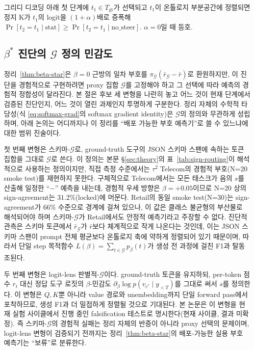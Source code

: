 \begin{corollary}[정지 K의 반복 편향]\label{cor:seka-repeat}
그리디 디코딩 아래 첫 단계에 $t_1\in T_{\mathrm{gt}}$가 선택되고 $t_1$이 온톨로지 부분공간에 정렬되면 정지 K가 $t_1$의 logit을 $(1+\alpha)$배로 증폭해 $\Pr[t_2=t_1\mid\text{stat}] \ge \Pr[t_2=t_1\mid\text{no\_steer}]$. $\alpha=0$일 때 등호.
\end{corollary}

\subsection{$\beta^*$ 진단의 $\mathcal{G}$ 정의 민감도}\label{app:G-sensitivity}

정리~\ref{thm:beta-star}은 $\beta=0$ 근방의 일차 부호를 $\pi_{\mathcal{G}}(\bar r_{\mathcal{G}} - \bar r)$로 환원하지만, 이 진단을 경험적으로 구현하려면 proxy 집합 $\mathcal{G}$를 고정해야 하고 그 선택에 따라 예측의 경험적 정합성이 달라진다. 본 절은 후보 세 변형을 나란히 놓고 어느 것이 현재 단계에서 검증된 진단인지, 어느 것이 열린 과제인지 투명하게 구분한다. 정리 자체의 수학적 타당성(식 \eqref{eq:softmax-grad}의 softmax gradient identity)은 $\mathcal{G}$의 정의와 무관하게 성립하며, 아래 논의는 어디까지나 이 정리를 ``배포 가능한 부호 예측기''로 쓸 수 있느냐에 대한 범위 진술이다.

첫 번째 변형은 스키마-$\mathcal{G}$로, ground-truth 도구의 JSON 스키마 스팬에 속하는 토큰 집합을 그대로 $\mathcal{G}$로 쓴다. 이 정의는 본문 §\ref{sec:theory}의 표~\ref{tab:sign-routing}이 해석적으로 사용하는 정의이지만, 직접 측정 수준에서는 $\tau^2$ Telecom의 경험적 부호(N=20 smoke test)를 재현하지 못한다. 구체적으로 Telecom에서는 모든 태스크가 음의 $s$를 산출해 일정한 ``$-$'' 예측을 내는데, 경험적 우세 방향은 $\beta = +0.05$이므로 N=20 상의 sign-agreement는 $31.2\%$(locked)에 머문다. Retail의 동일 smoke test(N=30)는 sign-agreement가 $66\%$ 수준으로 경계에 걸쳐 있으나, 이 값은 클래스 불균형의 부산물로 해석되어야 하며 스키마-$\mathcal{G}$가 Retail에서도 안정적 예측기라고 주장할 수 없다. 진단적 관측은 스키마 토큰에서 $\bar r_{\mathcal{G}}$가 $\bar r$보다 체계적으로 작게 나온다는 것인데, 이는 JSON 스키마 스팬이 prompt 전체 평균보다 온톨로지 축에 약하게 정렬되어 있기 때문이며, 따라서 단일 step 목적함수 $L(\beta) = \sum_{t\in\mathcal{G}} p_\beta(t)$가 생성 전 과정에 걸친 F1과 탈동조된다.

두 번째 변형은 logit-lens 판별적-$\mathcal{G}$이다. ground-truth 토큰을 유지하되, per-token 점수 $r_t$ 대신 정답 도구 로짓의 $\beta$-민감도 $\partial_\beta \log p(v_{c^*} \mid y_{<T})$를 그대로 써서 $s$를 정의한다. 이 변형은 $Q, K$뿐 아니라 value 경로와 unembedding까지 단일 forward pass에서 포착하므로, 생성 F1과 더 밀접하게 정렬될 것으로 기대된다. 본 논문은 이 변형을 현재 실험 사이클에서 진행 중인 falsification 테스트로 명시한다(현재 사이클, 결과 미확정). 즉 스키마-$\mathcal{G}$의 경험적 실패는 정리 자체의 반증이 아니라 proxy 선택의 문제이며, logit-lens 변형이 검증되기 전까지는 정리~\ref{thm:beta-star}의 배포-가능한 실용 부호 예측기는 ``보류''로 분류한다.

